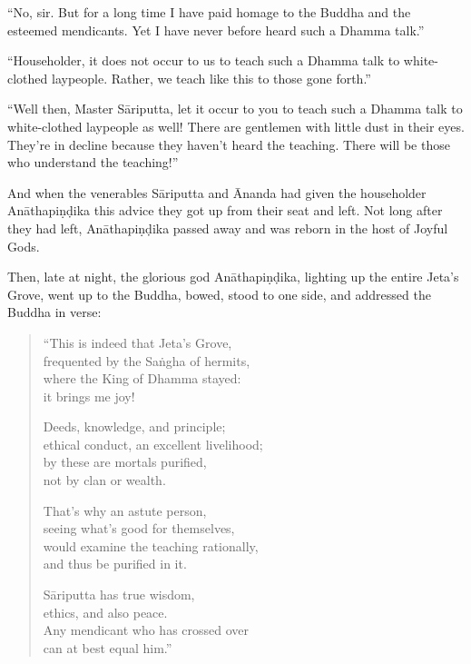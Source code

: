 \documentclass[12pt,openany]{book}%
\begin{document}
“No, sir. But for a long time I have paid homage to the Buddha and the esteemed mendicants. Yet I have never before heard such a Dhamma talk.” 

“Householder, it does not occur to us to teach such a Dhamma talk to white-clothed laypeople. Rather, we teach like this to those gone forth.” 

“Well then, Master \textsanskrit{Sāriputta}, let it occur to you to teach such a Dhamma talk to white-clothed laypeople as well! There are gentlemen with little dust in their eyes. They’re in decline because they haven’t heard the teaching. There will be those who understand the teaching!” 

And when the venerables \textsanskrit{Sāriputta} and Ānanda had given the householder \textsanskrit{Anāthapiṇḍika} this advice they got up from their seat and left. Not long after they had left, \textsanskrit{Anāthapiṇḍika} passed away and was reborn in the host of Joyful Gods. 

Then, late at night, the glorious god \textsanskrit{Anāthapiṇḍika}, lighting up the entire Jeta’s Grove, went up to the Buddha, bowed, stood to one side, and addressed the Buddha in verse: 

\begin{verse}%
“This is indeed that Jeta’s Grove, \\
frequented by the \textsanskrit{Saṅgha} of hermits, \\
where the King of Dhamma stayed: \\
it brings me joy! 

Deeds, knowledge, and principle; \\
ethical conduct, an excellent livelihood; \\
by these are mortals purified, \\
not by clan or wealth. 

That’s why an astute person, \\
seeing what’s good for themselves, \\
would examine the teaching rationally, \\
and thus be purified in it. 

\textsanskrit{Sāriputta} has true wisdom, \\
ethics, and also peace. \\
Any mendicant who has crossed over \\
can at best equal him.” 

%
\end{verse}
\end{document}
